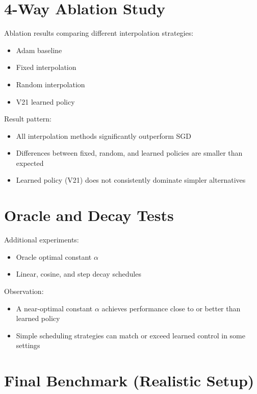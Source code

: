 \documentclass{article}
\begin{document}
\section{4-Way Ablation Study}

Ablation results comparing different interpolation strategies:

\begin{itemize}
    \item Adam baseline
    \item Fixed interpolation
    \item Random interpolation
    \item V21 learned policy
\end{itemize}

Result pattern:

\begin{itemize}
    \item All interpolation methods significantly outperform SGD
    \item Differences between fixed, random, and learned policies are smaller than expected
    \item Learned policy (V21) does not consistently dominate simpler alternatives
\end{itemize}

\section{Oracle and Decay Tests}

Additional experiments:

\begin{itemize}
    \item Oracle optimal constant $\alpha$
    \item Linear, cosine, and step decay schedules
\end{itemize}

Observation:

\begin{itemize}
    \item A near-optimal constant $\alpha$ achieves performance close to or better than learned policy
    \item Simple scheduling strategies can match or exceed learned control in some settings
\end{itemize}

\section{Final Benchmark (Realistic Setup)}
\end{document}
